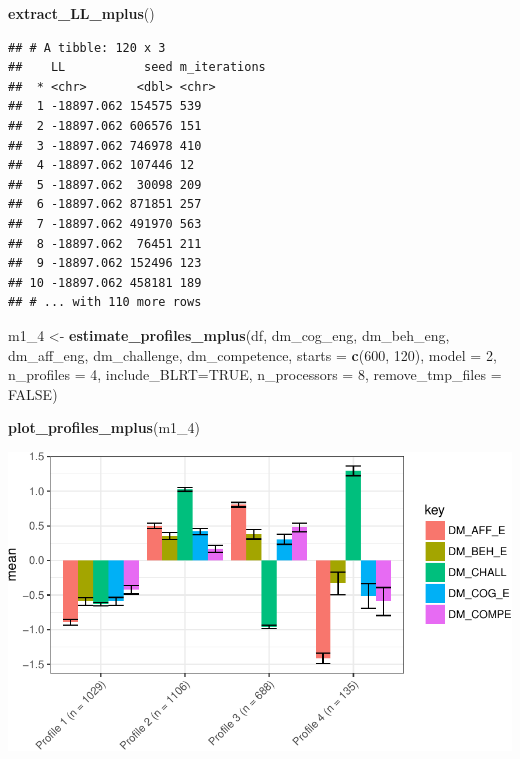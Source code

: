 \documentclass[]{book}
\newenvironment{Shaded}{\begin{snugshade}}{\end{snugshade}}
\newcommand{\KeywordTok}[1]{\textcolor[rgb]{0.13,0.29,0.53}{\textbf{#1}}}
\newcommand{\DataTypeTok}[1]{\textcolor[rgb]{0.13,0.29,0.53}{#1}}
\newcommand{\DecValTok}[1]{\textcolor[rgb]{0.00,0.00,0.81}{#1}}
\newcommand{\StringTok}[1]{\textcolor[rgb]{0.31,0.60,0.02}{#1}}
\newcommand{\OtherTok}[1]{\textcolor[rgb]{0.56,0.35,0.01}{#1}}
\newcommand{\NormalTok}[1]{#1}
\begin{document}
\begin{Shaded}
\begin{Highlighting}[]
\KeywordTok{extract_LL_mplus}\NormalTok{()}
\end{Highlighting}
\end{Shaded}

\begin{verbatim}
## # A tibble: 120 x 3
##    LL           seed m_iterations
##  * <chr>       <dbl> <chr>       
##  1 -18897.062 154575 539         
##  2 -18897.062 606576 151         
##  3 -18897.062 746978 410         
##  4 -18897.062 107446 12          
##  5 -18897.062  30098 209         
##  6 -18897.062 871851 257         
##  7 -18897.062 491970 563         
##  8 -18897.062  76451 211         
##  9 -18897.062 152496 123         
## 10 -18897.062 458181 189         
## # ... with 110 more rows
\end{verbatim}

\begin{Shaded}
\begin{Highlighting}[]
\NormalTok{m1_}\DecValTok{4}\NormalTok{ <-}\StringTok{ }\KeywordTok{estimate_profiles_mplus}\NormalTok{(df,  }
\NormalTok{                             dm_cog_eng, dm_beh_eng, dm_aff_eng, dm_challenge, dm_competence,}
                             \DataTypeTok{starts =} \KeywordTok{c}\NormalTok{(}\DecValTok{600}\NormalTok{, }\DecValTok{120}\NormalTok{),}
                             \DataTypeTok{model =} \DecValTok{2}\NormalTok{,}
                             \DataTypeTok{n_profiles =} \DecValTok{4}\NormalTok{,}
                             \DataTypeTok{include_BLRT=}\OtherTok{TRUE}\NormalTok{,}
                             \DataTypeTok{n_processors =} \DecValTok{8}\NormalTok{, }\DataTypeTok{remove_tmp_files =} \OtherTok{FALSE}\NormalTok{)}

\KeywordTok{plot_profiles_mplus}\NormalTok{(m1_}\DecValTok{4}\NormalTok{)}
\end{Highlighting}
\end{Shaded}

\includegraphics{rosenberg-dissertation_files/figure-latex/spec-solutions-model2-4-1.pdf}
\end{document}
